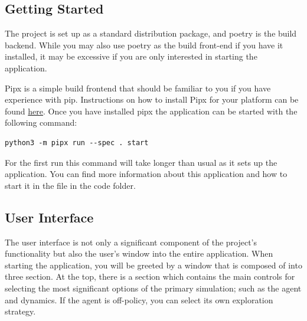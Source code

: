 \documentclass[]{final_report}
\begin{document}
\subsection{Getting Started}

The project is set up as a standard distribution package, and poetry is the build backend. While you may also use poetry as the build front-end if you have it installed, it may be excessive if you are only interested in starting the application.

Pipx is a simple build frontend that should be familiar to you if you have experience with pip. Instructions on how to install Pipx for your platform can be found \href{https://pipx.pypa.io/stable/installation/}{here}. Once you have installed pipx the application can be started with the following command:
\begin{verbatim}
python3 -m pipx run --spec . start
\end{verbatim}
For the first run this command will take longer than usual as it sets up the application. You can find more information about this application and how to start it in the  file in the code folder.

\subsection{User Interface}

The user interface is not only a significant component of the project's functionality but also the user's window into the entire application. When starting the application, you will be greeted by a window that is composed of into three section. At the top, there is a section which contains the main controls for selecting the most significant options of the primary simulation; such as the agent and dynamics. If the agent is off-policy, you can select its own exploration strategy. 
\end{document}
